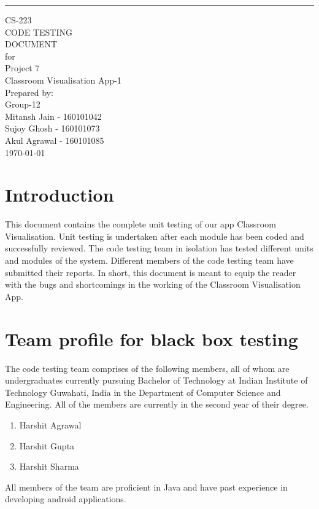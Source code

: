 \documentclass{scrreprt}
\date{}
\title{}
\begin{document}
\begin{flushright}
    \rule{16cm}{5pt}\vskip1cm
    \begin{bfseries}
        \Huge{CS-223\\CODE TESTING\\ DOCUMENT}\\
        \vspace{1.5cm}
        for\\
        \vspace{1.5cm}
        Project 7\\
        Classroom Visualisation App-1\\
        
        \vspace{1.9cm}
        \LARGE{Prepared by: }\\
        Group-12\\
        Mitansh Jain - 160101042\\
        Sujoy Ghosh - 160101073\\
        Akul Agrawal - 160101085\\
        \vspace{1.9cm}
        \today\\
    \end{bfseries}
\end{flushright}
\tableofcontents
\listoffigures

\chapter{Introduction}
This document contains the complete unit testing of our app Classroom Visualisation.
Unit testing is undertaken after each module has been coded and successfully reviewed.
The code testing team in isolation has tested different units and modules of the system.
Different members of the code testing team have submitted their reports.
In short, this document is meant to equip the reader with the bugs and shortcomings in the
working of the Classroom Visualisation App.

\chapter{Team profile for black box testing}
The code testing team comprises of the following members, all of whom are undergraduates currently pursuing Bachelor of Technology at Indian Institute of Technology Guwahati, India in the Department of Computer Science and Engineering. All of the members are currently in the second year of their degree.
\begin{enumerate}
  \item Harshit Agrawal
  \item Harshit Gupta
  \item Harshit Sharma
\end{enumerate}
All members of the team are proficient in Java and have past experience in developing android applications.
\end{document}
